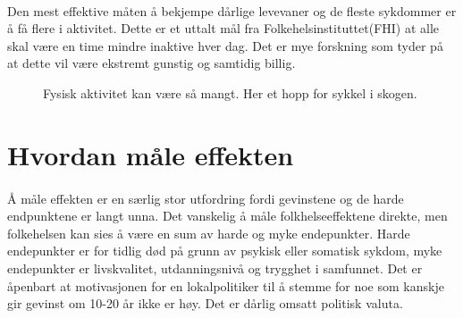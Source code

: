 \documentclass[11pt]{memoir} %
\begin{document}
		\paragraph{}
			Den mest effektive måten å bekjempe dårlige levevaner og de fleste sykdommer er å få flere i aktivitet\cite{aktivhb}. Dette er et uttalt mål fra Folkehelsinstituttet(FHI)\cite{htnorge} at alle skal være en time mindre inaktive hver dag. Det er mye forskning som tyder på at dette vil være ekstremt gunstig og samtidig billig\cite{aktivhb}.
					\begin{figure}[h]
                      \centering
                    	  \captionsetup{singlelinecheck=off}
                      	\caption{Fysisk aktivitet kan være så mangt. Her et hopp for sykkel i skogen.}
                      	\label{bikeukfig}
                    \end{figure}  

	\section{Hvordan måle effekten}
		\paragraph{}
			Å måle effekten er en særlig stor utfordring fordi gevinstene og de harde endpunktene er langt unna. Det vanskelig å måle folkhelseeffektene direkte, men folkehelsen kan sies å være en sum av harde og myke endepunkter. Harde endepunkter er for tidlig død på grunn av psykisk eller somatisk sykdom, myke endepunkter er livskvalitet, utdanningsnivå og trygghet i samfunnet. Det er åpenbart at motivasjonen for en lokalpolitiker til å stemme for noe som kanskje gir gevinst om 10-20 år ikke er høy. Det er dårlig omsatt politisk valuta. 
\end{document}
